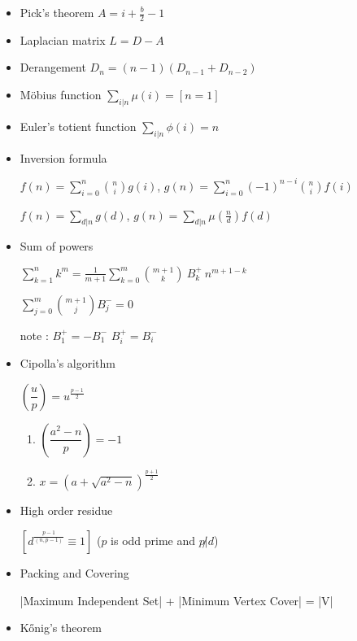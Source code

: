 \begin{itemize}

    \item Pick's theorem
    $A=i+\frac{b}{2}-1$

    \item Laplacian matrix
    $L = D - A$

    \item Derangement
    $D_n=(n-1)(D_{n-1}+D_{n-2})$

    \item Möbius function
	$\sum\limits_{i|n} \mu(i)=[n=1]$
	
	\item Euler's totient function
    $\sum\limits_{i|n} \phi(i)=n$

    \item Inversion formula

    $f(n)=\sum\limits_{i=0}^n{n \choose i}g(i)$,
    $g(n)=\sum\limits_{i=0}^n(-1)^{n-i}{n \choose i}f(i)$

    $f(n)=\sum\limits_{d|n}g(d)$,
    $g(n)=\sum\limits_{d|n}\mu(\frac{n}{d})f(d)$

    \item Sum of powers

    $\sum_{k=1}^{n} k^m=\frac{1}{m+1}\sum_{k=0}^{m}{{m+1}\choose{k}}~B^+_k~n^{m+1-k}$

    $\sum_{j=0}^{m}{m+1\choose j}B^-_j=0$

    note :
    $B^+_1=-B^-_1$
    $B^+_i=B^-_i$

    \item Cipolla's algorithm

    $\left(\dfrac{u}{p}\right)=u^{\frac{p-1}{2}}$

    \begin{enumerate}
        \item $\left(\dfrac{a^2-n}{p}\right)=-1$
        \item $x=(a+\sqrt{a^2-n})^{\frac{p+1}{2}}$
    \end{enumerate}

    \item High order residue

    $[d^{\frac{p-1}{(n,p-1)}}\equiv 1]$ ($p$ is odd prime and $p \not | d$)

    \item Packing and Covering
	
	|Maximum Independent Set| + |Minimum Vertex Cover| = |V|

    \item Kőnig's theorem


\end{itemize}
